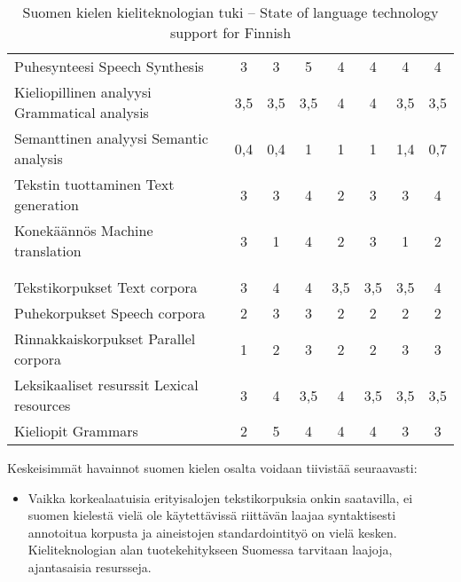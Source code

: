 \documentclass[]{../../metanetpaper}
\begin{document}
\begin{multicols}{2}
\begin{table}
\begin{tabular}{>{\columncolor[RGB]{255,190,000}}p{.33\linewidth}ccccccc}
 Puhesynteesi \newline Speech Synthesis & 3 & 3 & 5 & 4 & 4 & 4 & 4 \\
 Kieliopillinen analyysi \newline Grammatical analysis
                                     & 3,5 & 3,5 & 3,5 & 4 & 4 & 3,5 & 3,5\\
 Semanttinen analyysi \newline Semantic analysis
                                     & 0,4 & 0,4 & 1 & 1 & 1 & 1,4 & 0,7 \\
 Tekstin tuottaminen \newline Text generation & 3 & 3 & 4 & 2 & 3 & 3 & 4 \\
 Konekäännös \newline Machine translation & 3 & 1 & 4 & 2 & 3 & 1 & 2 \\
 \midrule
 \multicolumn{8}{>{\columncolor[RGB]{255,155,000}}l}{Kieliaineistot:
aineistot, tietokannat ja tietämyskannat} \\\addlinespace[{-.009cm}]
 \multicolumn{8}{>{\columncolor[RGB]{255,155,000}}l}{Language Resources:
Resources, Data and Knowledge Bases} \\
 \midrule
 Tekstikorpukset \newline Text corpora & 3 & 4 & 4 & 3,5 & 3,5 & 3,5 & 4 \\
 Puhekorpukset \newline Speech corpora & 2 & 3 & 3 & 2 & 2 & 2 & 2 \\
 Rinnakkaiskorpukset \newline Parallel corpora
                                       & 1 & 2 & 3 & 2 & 2 & 3 & 3 \\
 Leksikaaliset resurssit \newline Lexical resources
                                & 3 & 4 & 3,5 & 4 & 3,5 & 3,5 & 3,5 \\
 Kieliopit \newline Grammars & 2 & 5 & 4 & 4 & 4 & 3 & 3 \\
 \bottomrule
 \end{tabular}
 \label{tab:finnish_table}
 \caption{Suomen kielen kieliteknologian tuki -- State of
language technology support for Finnish}
 \end{table}


Keskeisimmät havainnot suomen kielen osalta voidaan tiivistää seuraavasti:
\begin{itemize}
\item Vaikka korkealaatuisia erityisalojen tekstikorpuksia onkin
    saatavilla, ei suomen kielestä vielä ole käytettävissä riittävän
    laajaa syntaktisesti annotoitua korpusta ja aineistojen
    standardointityö on vielä kesken.  Kieliteknologian alan
    tuotekehitykseen Suomessa tarvitaan laajoja, ajantasaisia
    resursseja.


\end{itemize}
\end{multicols}
\end{document}
